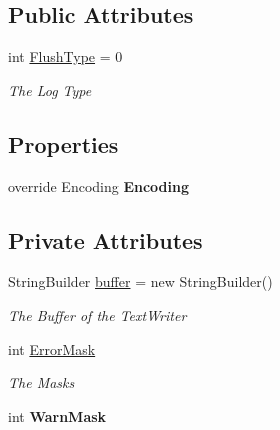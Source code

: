 \subsection*{Public Attributes}
\begin{DoxyCompactItemize}
\item 
int \mbox{\hyperlink{class_a_d_l_1_1_unity_1_1_unity_text_writer_a5d9cf1373da2cf300bf88f11f8ec078a}{Flush\+Type}} = 0
\begin{DoxyCompactList}\small\item\em The Log Type \end{DoxyCompactList}\end{DoxyCompactItemize}
\subsection*{Properties}
\begin{DoxyCompactItemize}
\item 
\mbox{\label{class_a_d_l_1_1_unity_1_1_unity_text_writer_ae188dacb6a045f6f314480f0fbd18ccc}} 
override Encoding {\bfseries Encoding}
\end{DoxyCompactItemize}
\subsection*{Private Attributes}
\begin{DoxyCompactItemize}
\item 
String\+Builder \mbox{\hyperlink{class_a_d_l_1_1_unity_1_1_unity_text_writer_a82d384fccb5754b9151b8b71343df72c}{buffer}} = new String\+Builder()
\begin{DoxyCompactList}\small\item\em The Buffer of the Text\+Writer \end{DoxyCompactList}\item 
int \mbox{\hyperlink{class_a_d_l_1_1_unity_1_1_unity_text_writer_a150a993a52f0ede7a6f8ba04728b4bfe}{Error\+Mask}}
\begin{DoxyCompactList}\small\item\em The Masks \end{DoxyCompactList}\item 
\mbox{\label{class_a_d_l_1_1_unity_1_1_unity_text_writer_ae07fed312fdf4cc4e305d9f6ba9159a5}} 
int {\bfseries Warn\+Mask}
\end{DoxyCompactItemize}


